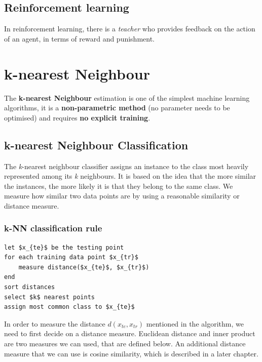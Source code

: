 \documentclass[11pt,fleqn]{book} %
\begin{document}
\section{Reinforcement learning}
In reinforcement learning, there is a \textit{teacher} who provides feedback on the action of an agent, in terms of reward and punishment.


\chapter{k-nearest Neighbour}
The \textbf{k-nearest Neighbour} estimation is one of the simplest machine learning algorithms, it is a \textbf{non-parametric method} (no parameter needs to be optimised) and requires \textbf{no explicit training}.

\section{k-nearest Neighbour Classification}
The \textit{k}-nearest neighbour classifier assigns an instance to the class most heavily represented among its \textit{k} neighbours. It is based on the idea that the more similar the instances, the more likely it is that they belong to the same class. We measure how similar two data points are by using a reasonable similarity or distance measure.

\subsection{k-NN classification rule}
\begin{lstlisting}[mathescape]
let $x_{te}$ be the testing point
for each training data point $x_{tr}$
    measure distance($x_{te}$, $x_{tr}$)
end
sort distances
select $k$ nearest points
assign most common class to $x_{te}$
\end{lstlisting}

\noindent
In order to measure the distance $d(x_{te}, x_{tr})$ mentioned in the algorithm, we need to first decide on a distance measure. Euclidean distance and inner product are two measures we can used, that are defined below. An additional distance measure that we can use is cosine similarity, which is described in a later chapter.\\
\end{document}
